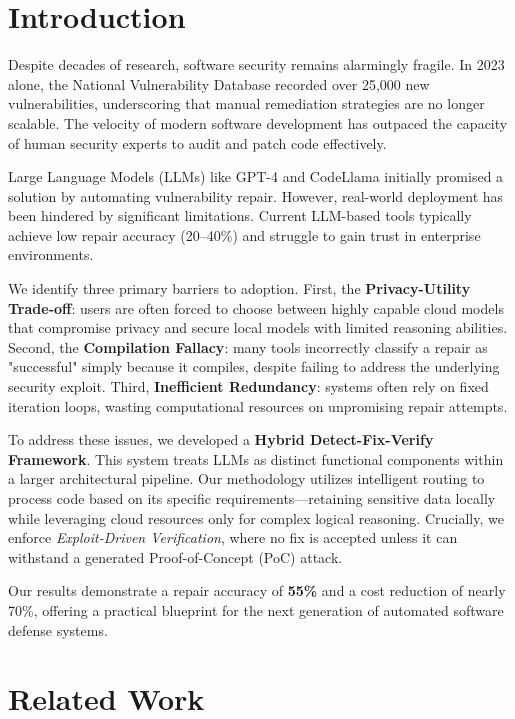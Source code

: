 \documentclass[conference]{IEEEtran}
\begin{document}
\section{Introduction}

Despite decades of research, software security remains alarmingly fragile. In 2023 alone, the National Vulnerability Database recorded over 25,000 new vulnerabilities, underscoring that manual remediation strategies are no longer scalable. The velocity of modern software development has outpaced the capacity of human security experts to audit and patch code effectively.

Large Language Models (LLMs) like GPT-4 and CodeLlama initially promised a solution by automating vulnerability repair. However, real-world deployment has been hindered by significant limitations. Current LLM-based tools typically achieve low repair accuracy (20--40\%) and struggle to gain trust in enterprise environments.

We identify three primary barriers to adoption. First, the \textbf{Privacy-Utility Trade-off}: users are often forced to choose between highly capable cloud models that compromise privacy and secure local models with limited reasoning abilities. Second, the \textbf{Compilation Fallacy}: many tools incorrectly classify a repair as "successful" simply because it compiles, despite failing to address the underlying security exploit. Third, \textbf{Inefficient Redundancy}: systems often rely on fixed iteration loops, wasting computational resources on unpromising repair attempts.

To address these issues, we developed a \textbf{Hybrid Detect-Fix-Verify Framework}. This system treats LLMs as distinct functional components within a larger architectural pipeline. Our methodology utilizes intelligent routing to process code based on its specific requirements—retaining sensitive data locally while leveraging cloud resources only for complex logical reasoning. Crucially, we enforce \textit{Exploit-Driven Verification}, where no fix is accepted unless it can withstand a generated Proof-of-Concept (PoC) attack.

Our results demonstrate a repair accuracy of \textbf{55\%} and a cost reduction of nearly 70\%, offering a practical blueprint for the next generation of automated software defense systems.

\section{Related Work}
\end{document}
